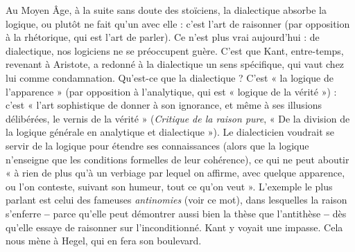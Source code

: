 Au Moyen Âge, à la suite sans doute des stoïciens, la dialectique absorbe
la logique, ou plutôt ne fait qu’un avec elle : c’est l’art de raisonner (par opposition
à la rhétorique, qui est l’art de parler). Ce n’est plus vrai aujourd’hui :
de dialectique, nos logiciens ne se préoccupent guère. C’est que Kant, entre-temps,
revenant à Aristote, a redonné à la dialectique un sens spécifique, qui
vaut chez lui comme condamnation. Qu'est-ce que la dialectique ? C’est « la
logique de l’apparence » (par opposition à l’analytique, qui est « logique de la
vérité ») : c’est « l’art sophistique de donner à son ignorance, et même à ses
illusions délibérées, le vernis de la vérité » ({\it Critique de la raison pure}, « De la
division de la logique générale en analytique et dialectique »). Le dialecticien
voudrait se servir de la logique pour étendre ses connaissances (alors que la
logique n’enseigne que les conditions formelles de leur cohérence), ce qui ne
peut aboutir « à rien de plus qu’à un verbiage par lequel on affirme, avec
quelque apparence, ou l’on conteste, suivant son humeur, tout ce qu’on
veut ». L'exemple le plus parlant est celui des fameuses {\it antinomies} (voir ce
mot), dans lesquelles la raison s’enferre {\bf --} parce qu’elle peut démontrer aussi
bien la thèse que l’antithèse {\bf --} dès qu’elle essaye de raisonner sur l’inconditionné.
Kant y voyait une impasse. Cela nous mène à Hegel, qui en fera son
boulevard.

